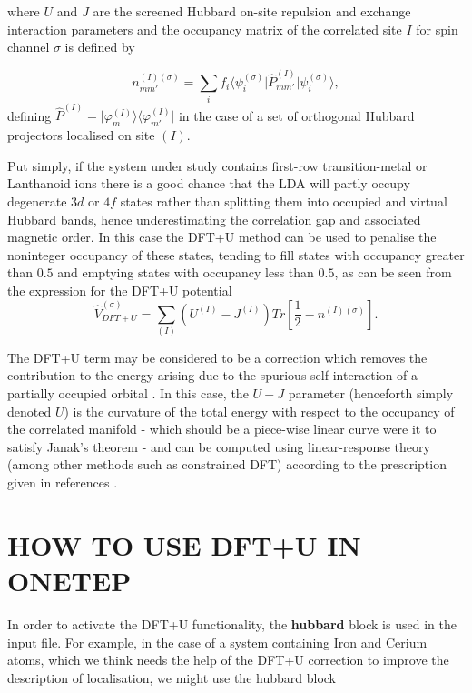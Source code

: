 \documentclass[a4paper,oneside,11pt]{article}
\numberwithin{equation}{section}
\begin{document}
where $U$ and $J$ are the screened Hubbard on-site repulsion and exchange interaction parameters and the occupancy matrix of the correlated site $I$ for spin channel $\sigma$ is defined by

\begin{equation}
n^{(I)(\sigma)}_{m m'} = \sum_i f_i \langle \psi_i^{(\sigma)} \rvert \hat{P}^{(I)}_{m m'} \lvert \psi_i^{(\sigma)} \rangle,
\end{equation} 
defining $\hat{P}^{(I)} = \lvert \varphi^{(I)}_m \rangle \langle \varphi^{(I)}_{m'} \rvert$ in the case of a set of
orthogonal Hubbard projectors localised on site $(I)$.

Put simply, if the system under study contains first-row transition-metal 
or Lanthanoid ions there is a good chance that the LDA will partly 
occupy degenerate $3d$ or $4f$ states rather than splitting them into occupied and
virtual Hubbard bands, hence underestimating the correlation gap and 
associated magnetic order. In this case the DFT+U method can be used to 
penalise the noninteger occupancy of these states, tending to fill states
 with occupancy greater than $0.5$ and emptying states with occupancy less than $0.5$, 
as can be seen from the expression for the DFT+U potential
\begin{equation}
\hat{V}^{(\sigma)}_{DFT+U} = \sum_{(I)} \left( U^{(I)}-J^{(I)} \right) Tr \left[ \frac{1}{2} - n^{(I) (\sigma)} \right].
\end{equation} 

The DFT+U term may 
be considered to be a correction which removes the contribution to the energy
arising due to the spurious self-interaction of a partially occupied
orbital \cite{Cococcioni1}. In this case, the $U-J$ parameter (henceforth simply denoted $U$)
is the curvature of the total energy with respect to the occupancy
of the correlated manifold - which should be a piece-wise linear curve
were it to satisfy Janak's theorem \cite{Janak} - and can be computed using linear-response
theory (among other methods such as constrained DFT) according to the prescription given in references \cite{Cococcioni1,Cococcioni2}.

\section*{HOW TO USE DFT+U IN ONETEP}

In order to activate the DFT+U functionality, the \textbf{hubbard} block
is used in the input file. For example, in the case of a system 
containing Iron and Cerium atoms, which we think needs the 
help of the DFT+U correction to improve the description of localisation, 
we might use the hubbard block 
\end{document}
